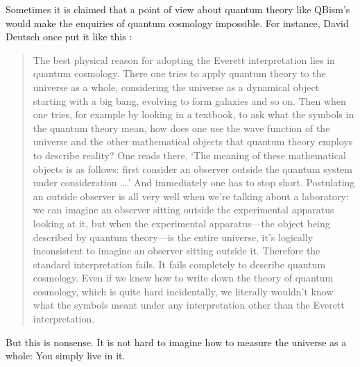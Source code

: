 Sometimes it is claimed that a point of view about quantum theory like QBism's would make the enquiries of quantum cosmology impossible.  For instance, David Deutsch once put it like this \cite{Deutsch86}:
\begin{quotation}
\small The best physical reason for adopting the Everett interpretation lies in quantum cosmology.  There one tries to apply quantum theory to the universe as a whole, considering the universe as a dynamical object starting with a big bang, evolving to form galaxies and so on. Then when one tries, for example by looking in a textbook, to ask what the symbols in the quantum theory mean, how does one use the wave function of the universe and the other mathematical objects that quantum theory employs to describe reality?  One reads there, `The meaning of these mathematical objects is as follows:  first consider an observer outside the quantum system under consideration \ldots.' And immediately one has to stop short.  Postulating an outside observer is all very well when we're talking about a laboratory:  we can imagine an observer sitting outside the experimental apparatus looking at it, but when the experimental apparatus---the object being described by quantum theory---is the entire universe, it's logically inconsistent to imagine an observer sitting outside it. Therefore the standard interpretation fails.  It fails completely to describe quantum cosmology.  Even if we knew how to write down the theory of quantum cosmology, which is quite hard incidentally, we literally wouldn't know what the symbols meant under any interpretation other than the Everett interpretation.
\end{quotation}
But this is nonsense.  It is not hard to imagine how to measure the universe as a whole:  You simply live in it.

